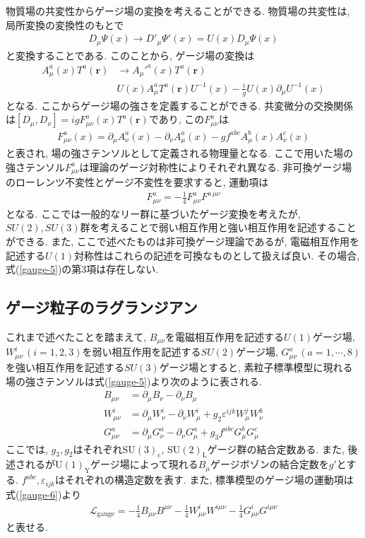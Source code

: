物質場の共変性からゲージ場の変換を考えることができる.
物質場の共変性は, 局所変換の変換性のもとで
\begin{align}
  D_\mu\Psi(x) \rightarrow D'_\mu \Psi'(x) = U(x) D_\mu \Psi(x)\label{gauge-3}
\end{align}
と変換することである.
このことから, ゲージ場の変換は
\begin{align}
   A_\mu^a(x) T^a(\bm{r}) &\rightarrow A_\mu'^a(x) T^a(\bm{r})\nonumber\\
                          & U(x)A_\mu^a T^a(\bm{r}) U^{-1}(x) -\frac{i}{g}U(x)\partial_\mu U^{-1}(x) \label{gauge-4}
\end{align}
となる.
ここからゲージ場の強さを定義することができる.
共変微分の交換関係は$[D_\mu,D_\nu] = igF_{\mu\nu}^a(x)T^a(\bm{r})$であり, この$F_{\mu\nu}^a$は
\begin{align}
  F_{\mu\nu}^a(x) = \partial_\mu A_\nu^a(x) - \partial_\nu A_\mu^a(x) - gf^{abc}A_\mu^b(x)A_\nu^c(x)\label{gauge-5}
\end{align}
と表され, 場の強さテンソルとして定義される物理量となる.
ここで用いた場の強さテンソル$F_{\mu\nu}^a$は理論のゲージ対称性によりそれぞれ異なる.
非可換ゲージ場のローレンツ不変性とゲージ不変性を要求すると, 運動項は
\begin{align}
  F_{\mu\nu}^a = -\frac{1}{4}F_{\mu\nu}^a F^{a\,\mu\nu}\label{gauge-6}
\end{align}
となる.
ここでは一般的なリー群に基づいたゲージ変換を考えたが, $SU(2), SU(3)$群を考えることで弱い相互作用と強い相互作用を記述することができる.
また, ここで述べたものは非可換ゲージ理論であるが, 電磁相互作用を記述する$U(1)$対称性はこれらの記述を可換なものとして扱えば良い.
その場合, 式(\ref{gauge-5})の第3項は存在しない.
\subsection{ゲージ粒子のラグランジアン}
これまで述べたことを踏まえて, $B_{\mu\nu}$を電磁相互作用を記述する$U(1)$ゲージ場, $W_{\mu\nu}^i\,(i=1,2,3)$を弱い相互作用を記述する$SU(2)$ゲージ場, $G_{\mu\nu}^a\,(a=1,\cdots,8)$を強い相互作用を記述する$SU(3)$ゲージ場とすると, 素粒子標準模型に現れる場の強さテンソルは式(\ref{gauge-5})より次のように表される.
\begin{align}
  B_{\mu\nu} &= \partial_\mu B_\nu - \partial_\nu B_\mu \label{gauge.B}\\
  W_{\mu\nu}^i &= \partial_\mu W_\nu^i - \partial_\nu W_\mu^i+g_2\varepsilon^{ijk}W_\mu^j W_\nu^k \label{gauge.W}\\
  G_{\mu\nu}^a &= \partial_\mu G_\nu^a - \partial_\nu G_\mu^a +g_3 f^{abc}G_\mu^b G_\mu^c\label{gauge.G}
\end{align}
ここでは, $g_3, g_2$はそれぞれ$\mathrm{SU}(3)_\mathrm{c}$, $\mathrm{SU}(2)_\mathrm{L}$ゲージ群の結合定数ある.
また, 後述されるが$\mathrm{U(1)}_{\mathrm {Y}}$ゲージ場によって現れる$B_\mu$ゲージボゾンの結合定数を$g'$とする.
$f^{abc}, \varepsilon_{ijk} $はそれぞれの構造定数を表す.
また, 標準模型のゲージ場の運動項は式(\ref{gauge-6})より
\begin{align}
  \mathcal{L}_{\text{gauge}} = -\frac{1}{4}B_{\mu\nu} B^{\mu\nu} - \frac{1}{4}W_{\mu\nu}^i W^{i\mu\nu} -\frac{1}{4}G_{\mu\nu}^i G^{i\mu\nu}\label{gauge.kin}
\end{align}
と表せる.
